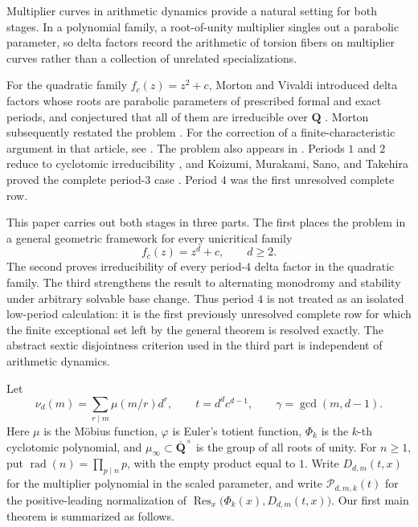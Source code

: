 \documentclass[11pt]{article}
\newcommand{\Q}{\mathbf Q}
\newcommand{\Res}{\operatorname{Res}}
\begin{document}
Multiplier curves in arithmetic dynamics provide a natural setting
for both stages.  In a polynomial family, a root-of-unity multiplier
singles out a parabolic parameter, so delta factors record the
arithmetic of torsion fibers on multiplier curves rather than a
collection of unrelated specializations.

For the quadratic family $f_c(z)=z^2+c$, Morton and Vivaldi introduced
delta factors whose roots are parabolic parameters of prescribed
formal and exact periods, and conjectured that all of them are
irreducible over $\Q$ \cite{MortonVivaldi1995}.  Morton subsequently
restated the problem \cite[Introduction]{Morton1996}.  For the
correction of a finite-characteristic argument in that article, see
\cite{Morton2011Corrigendum}.
The problem also appears in \cite[Exercise 4.12(e)**]{Silverman2007}.
Periods $1$ and $2$
reduce to cyclotomic irreducibility
\cite[Corollary 3.7]{MortonVivaldi1995}, and Koizumi, Murakami, Sano,
and Takehira proved the complete period-$3$ case
\cite[Theorem 1.2]{KoizumiMurakamiSanoTakehira2025}.  Period $4$ was
the first unresolved complete row.

This paper carries out both stages in three parts.  The first places the
problem in a general geometric framework for every unicritical family
\[
 f_c(z)=z^d+c,\qquad d\ge2.
\]
The second proves irreducibility of every period-$4$ delta factor in
the quadratic family.  The third strengthens the result to
alternating monodromy and stability under arbitrary solvable base
change.  Thus period $4$ is not treated as an isolated low-period
calculation: it is the first previously unresolved complete row for
which the finite exceptional set left by the general theorem is
resolved exactly.  The abstract sextic disjointness criterion used in
the third part is independent of arithmetic dynamics.

Let
\[
 \nu_d(m)=\sum_{r\mid m}\mu(m/r)d^r,\qquad
 t=d^dc^{d-1},\qquad \gamma=\gcd(m,d-1).
\]
Here $\mu$ is the M\"obius function, $\varphi$ is Euler's totient
function, $\Phi_k$ is the $k$-th cyclotomic polynomial, and
$\mu_\infty\subset\overline{\Q}^{\times}$ is the group of all roots of
unity.  For $n\geq 1$, put
$\operatorname{rad}(n)=\prod_{p\mid n}p$, with the empty product equal to
$1$.
Write $D_{d,m}(t,x)$ for the multiplier polynomial in the scaled
parameter, and write $\mathcal P_{d,m,k}(t)$ for the positive-leading
normalization of
$\Res_x\bigl(\Phi_k(x),D_{d,m}(t,x)\bigr)$.
Our first main theorem is summarized as follows.
\end{document}
